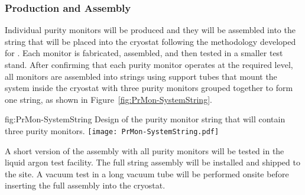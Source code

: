 
\subsubsection{Production and Assembly}
\label{sec:PrMon-Production-Assembly}
Individual purity monitors will be produced and they will be assembled into the string that will be placed into the  cryostat following the methodology developed for .  Each monitor is fabricated, assembled, and then tested in a smaller test stand.  After confirming that each purity monitor operates at the required level, all monitors are assembled into strings using support tubes that mount the system inside the cryostat with three purity monitors grouped together to form one string, as shown in Figure~\ref{fig:PrMon-SystemString}.




\begin{dunefigure}{fig:PrMon-SystemString}
  {Design of the purity monitor string that will contain three purity monitors.}
  \texttt{[image: PrMon-SystemString.pdf]}
\end{dunefigure}






A short version of the assembly with all purity monitors will be tested in the liquid argon test facility. The full string assembly will be installed and shipped to the  site. A vacuum test in a long vacuum tube will be performed onsite before inserting the full assembly into the  cryostat. 

